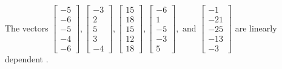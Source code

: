 \begin{exercise}
\begin{exerciseStatement}
  \end{exerciseStatement}
  \begin{exerciseAnswer}
   The vectors \(\left[\begin{array}{r}
-5 \\
-6 \\
-5 \\
-4 \\
-6
\end{array}\right] , \left[\begin{array}{r}
-3 \\
2 \\
5 \\
3 \\
-4
\end{array}\right] , \left[\begin{array}{r}
15 \\
18 \\
15 \\
12 \\
18
\end{array}\right] , \left[\begin{array}{r}
-6 \\
1 \\
-5 \\
-3 \\
5
\end{array}\right] , \text{ and } \left[\begin{array}{r}
-1 \\
-21 \\
-25 \\
-13 \\
-3
\end{array}\right]\) are 
  	 linearly dependent  .
  


  \end{exerciseAnswer}
\end{exercise}